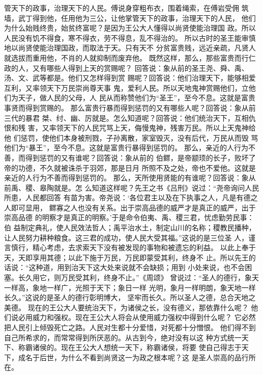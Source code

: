 \documentclass[12pt,UTF8]{ctexbook}
\begin{document}
管天下的政事，治理天下的人民。傅说身穿粗布衣，围着绳索，在傅岩受佣 
筑墙，武丁得到他，任用他为三公，让他掌管天下的政事，治理天下的人民， 
他们为什么始贱终贵，始贫终富呢？是因为王公大人懂得以尚贤使能治理国 
政。所以人民没有饥不得食，寒不得衣，劳不得息，乱不得治的。 
所以古时的圣王能审慎地以尚贤使能治理国政，而取法于天。只有天不 
分贫富贵贱，远近亲疏，凡贤人就选拔而重用他，不肖的人就抑制而废弃他。 
既然这样，那么，那些富贵而行仁政的人，又有哪些人得到上天的赏赐呢？ 
回答说：象从前的圣王尧、舜、禹、汤、文、武等都是。他们又怎样得到赏 
赐呢？回答说：他们治理天下，能够相爱互利，又率领天下万民崇尚尊天事 
鬼，爱利人民。所以天地鬼神赏赐他们，立他们为天子，做人民的父母，人 
民从而称赞他们为“圣王”，至今不息。这就是富贵事贤而得到赏赐的。 
那么富贵行暴而得到惩罚的又有哪些人呢？回答说：象从前三代的暴君 
桀、纣、幽、厉就是。怎么知道呢？回答说：他们统治天下，互相仇恨和残 
害，又率领天下的人民咒骂上天，侮慢鬼神，残害万民。所以上天鬼神给他 
们惩罚，使他们本身被刑戮，子孙离散，家室毁灭，没有后代，万民从而毁 
骂他们为“暴王”，至今不息。这就是富贵行暴得到惩罚的。 
那么，亲近的人行为不善，而得到惩罚的又有谁呢？回答说：象从前的 
伯鳏，是帝颛顼的长子，败坏了帝的功德，不久就被诛杀于羽郊，那是日月 
所照不及之处，帝也不爱他。这就是亲近的人行为不善而得到惩罚的。 
那么，天所使用贤能的有谁呢？回答说：象从前禹、稷、皋陶就是。怎 
么知道这样呢？先王之书《吕刑》说过：“尧帝询问人民所患，人民都回答 
有苗为害。帝尧说：‘各位君主以及在下执事之人，凡是有德之人即可显用， 
鳏寡之人也没有关系。出于崇高品德的威严才是真正的威严，出于崇高品德 
的明察才是真正的明察。’于是命令伯夷、禹、稷三君，忧虑勤劳民事：伯 
益制定典礼，使人民效法哲人；禹平治水土，制定山川的名称；稷教民播种， 
让人民努力耕种粮食。这三君的成功，使人民大受其福。”这说的是三位圣 
人，谨言慎行，精心考虑，去求索天下没有被发现的事物和被遗忘的利益。 
以此上奉于天，天即享用其德；以此下施于万民，万民即蒙受其利，终身不 
止。所以先王的话说：“这种道，用到治天下这大处来说就不会缺损；用到 
小处来说，也不会困塞。长久用它，则万民受其利，终身不止。”《周颂》 
曾说过：“圣人的德行，象天一样高，象地一样广，光照于天下；象日一样 
光明，象月一样明朗，象天地一样长久。”这说的是圣人的德行彰明博大， 
坚牢而长久。所以圣人之德，总合天地之美德。 
现在的王公大人要统治天下，为诸侯之长，没有德义，那依靠什么呢？ 
他们说必用威力和强权。现在王公大人将会从使用威力强权中得到什么呢？ 
它必然把人民引上倾毁死亡之路。人民对生都十分爱惜，对死都十分憎恨。 
他们得不到自己所希求的，而常常得到所厌恶的。从古到今，绝对没有以这 
种方式统一天下、称霸诸侯的。现在王公大人想统一天下，称霸诸侯，将要 
使自己得志于天下，成名于后世，为什么不看到尚贤这一为政之根本呢？这 
是圣人崇高的品行所在。 
\end{document}
